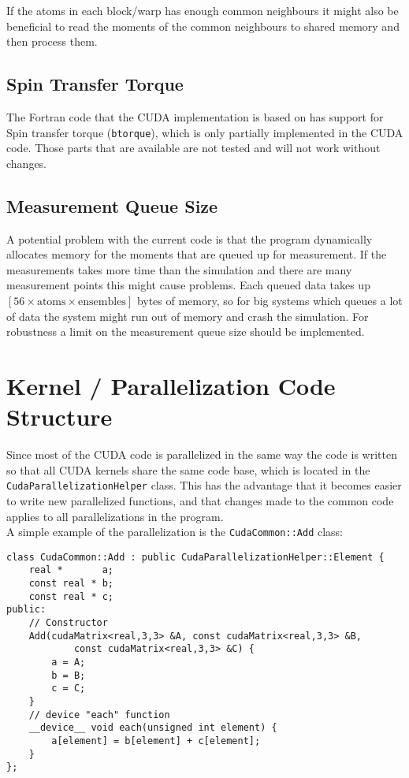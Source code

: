 \documentclass{article}
\begin{document}
If the atoms in each block/warp has enough common neighbours it might also be 
beneficial to read the moments of the common neighbours to shared memory and 
then process them.

\subsection{Spin Transfer Torque}
The Fortran code that the CUDA implementation is based on has support for 
Spin transfer torque (\verb|btorque|), which is only partially implemented 
in the CUDA code. Those parts that are available are not tested and will 
not work without changes.

\subsection{Measurement Queue Size}
A potential problem with the current code is that the program dynamically 
allocates memory for the moments that are queued up for measurement. If the 
measurements takes more time than the simulation and there are many 
measurement points this might cause problems. Each queued data takes up 
$[ 56 \times \text{atoms} \times \text{ensembles} ]$ bytes of memory, so for big 
systems which queues a lot of data the system might run out of memory and 
crash the simulation. For robustness a limit on the measurement queue size
should be implemented.




\section{Kernel / Parallelization Code Structure}
Since most of the CUDA code is parallelized in the same way the code is 
written so that all CUDA kernels share the same code base, which 
is located in the \verb|CudaParallelizationHelper| class. This has the 
advantage that it becomes easier to write new parallelized functions, 
and that changes made to the common code applies to all parallelizations 
in the program.\\

A simple example of the parallelization is the \verb|CudaCommon::Add| class:

\begin{verbatim}
class CudaCommon::Add : public CudaParallelizationHelper::Element {
    real *       a;
    const real * b;
    const real * c;
public:
    // Constructor
    Add(cudaMatrix<real,3,3> &A, const cudaMatrix<real,3,3> &B,
            const cudaMatrix<real,3,3> &C) {
        a = A;
        b = B;
        c = C;
    }
    // device "each" function
    __device__ void each(unsigned int element) {
        a[element] = b[element] + c[element];
    }
};
\end{verbatim}
\end{document}

